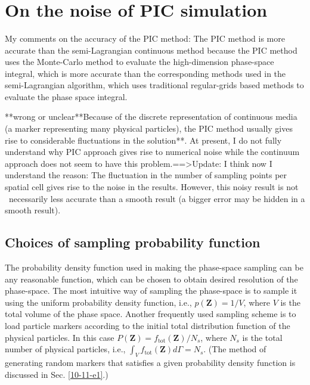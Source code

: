 \documentclass{article}
\newcommand{\tmop}[1]{\ensuremath{\operatorname{#1}}}
\begin{document}
\

\

\

\section{On the noise of PIC simulation}

My comments on the accuracy of the PIC method: The PIC method is more accurate
than the semi-Lagrangian continuous method because the PIC method uses the
Monte-Carlo method to evaluate the high-dimension phase-space integral, which
is more accurate than the corresponding methods used in the semi-Lagrangian
algorithm, which uses traditional regular-grids based methods to evaluate the
phase space integral.

**wrong or unclear**Because of the discrete representation of continuous media
(a marker representing many physical particles), the PIC method usually gives
rise to considerable fluctuations in the solution**. At present, I do not
fully understand why PIC approach gives rise to numerical noise while the
continuum approach does not seem to have this problem.==>Update: I think now I
understand the reason: The fluctuation in the number of sampling points per
spatial cell gives rise to the noise in the results. However, this noisy
result is not \ necessarily less accurate than a smooth result (a bigger error
may be hidden in a smooth result).

\subsection{Choices of sampling probability function}

The probability density function used in making the phase-space sampling can
be any reasonable function, which can be chosen to obtain desired resolution
of the phase-space. The most intuitive way of sampling the phase-space is to
sample it using the uniform probability density function, i.e., $p
(\mathbf{Z}) = 1 / V$, where $V$ is the total volume of the phase space.
Another frequently used sampling scheme is to load particle markers according
to the initial total distribution function of the physical particles. In this
case $P (\mathbf{Z}) = f_{\tmop{tot}} (\mathbf{Z}) / N_s$, where $N_s$ is the
total number of physical particles, i.e., $\int_V f_{\tmop{tot}} (\mathbf{Z})
d \Gamma = N_s$. (The method of generating random markers that satisfies a
given probability density function is discussed in Sec. \ref{10-11-e1}.)
\end{document}
